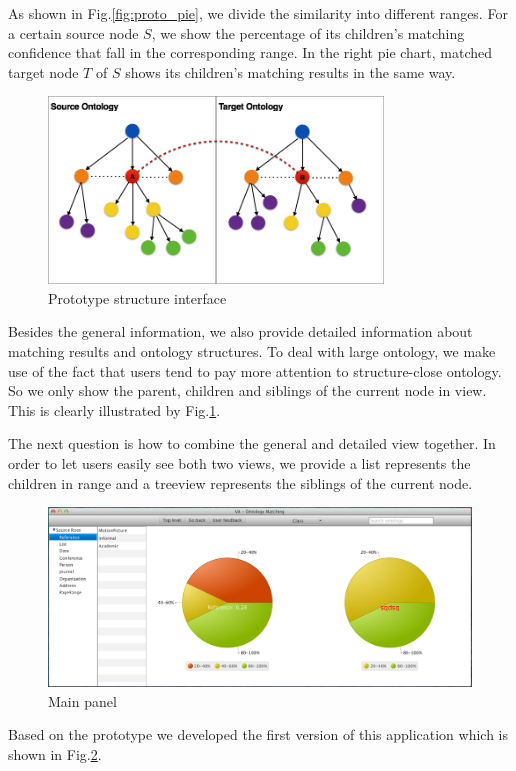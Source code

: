 As shown in Fig.\ref{fig:proto_pie}, we divide the similarity into different ranges. For a certain source node $S$, we show the percentage of its children's matching confidence that fall in the corresponding range. In the right pie chart, matched target node $T$ of $S$ shows its children's matching results in the same way. 

\begin{figure}[htb]
	\centering
	\includegraphics[width=3.5in]{pics/proto_tree.png}
	\caption{Prototype structure interface}
	\label{fig:proto_tree}
\end{figure}

Besides the general information, we also provide detailed information about matching results and ontology structures. To deal with large ontology, we make use of the fact that users tend to pay more attention to structure-close ontology. So we only show the parent, children and siblings of the current node in view. This is clearly illustrated by Fig.\ref{fig:proto_tree}.

The next question is how to combine the general and detailed view together. In order to let users easily see both two views, we provide a list represents the children in range and a treeview represents the siblings of the current node. 

\begin{figure}[!ht]
	\centering
	\includegraphics[width=6.5in]{pics/gui.png}
	\caption{Main panel}
	\label{fig:main_panel}
\end{figure}
Based on the prototype we developed the first version of this application which is shown in Fig.\ref{fig:main_panel}.

